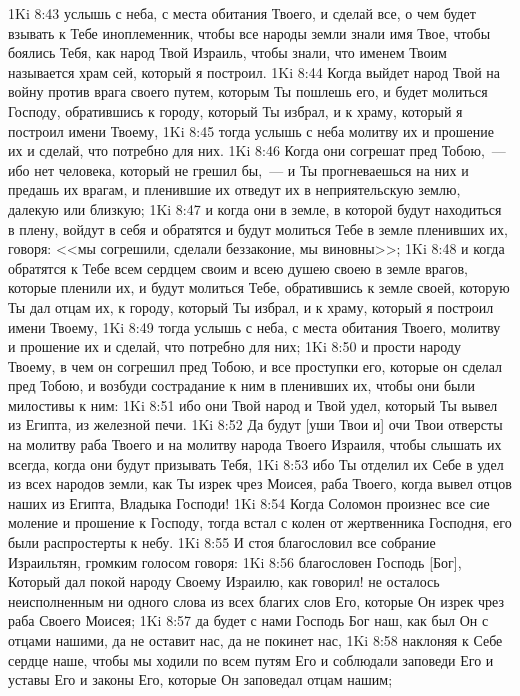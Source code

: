 \vs 1Ki 8:43 услышь с неба, с места обитания Твоего, и сделай все, о чем будет взывать к Тебе иноплеменник, чтобы все народы земли знали имя Твое, чтобы боялись Тебя, как народ Твой Израиль, чтобы знали, что именем Твоим называется храм сей, который я построил.
\vs 1Ki 8:44 Когда выйдет народ Твой на войну против врага своего путем, которым Ты пошлешь его, и будет молиться Господу, обратившись к городу, который Ты избрал, и к храму, который я построил имени Твоему,
\vs 1Ki 8:45 тогда услышь с неба молитву их и прошение их и сделай, что потребно для них.
\vs 1Ki 8:46 Когда они согрешат пред Тобою,~--- ибо нет человека, который не грешил бы,~--- и Ты прогневаешься на них и предашь их врагам, и пленившие их отведут их в неприятельскую землю, далекую или близкую;
\vs 1Ki 8:47 и когда они в земле, в которой будут находиться в плену, войдут в себя и обратятся и будут молиться Тебе в земле пленивших их, говоря: <<мы согрешили, сделали беззаконие, мы виновны>>;
\vs 1Ki 8:48 и когда обратятся к Тебе всем сердцем своим и всею душею своею в земле врагов, которые пленили их, и будут молиться Тебе, обратившись к земле своей, которую Ты дал отцам их, к городу, который Ты избрал, и к храму, который я построил имени Твоему,
\vs 1Ki 8:49 тогда услышь с неба, с места обитания Твоего, молитву и прошение их и сделай, что потребно для них;
\vs 1Ki 8:50 и прости народу Твоему, в чем он согрешил пред Тобою, и все проступки его, которые он сделал пред Тобою, и возбуди сострадание к ним в пленивших их, чтобы они были милостивы к ним:
\vs 1Ki 8:51 ибо они Твой народ и Твой удел, который Ты вывел из Египта, из железной печи.
\vs 1Ki 8:52 Да будут [уши Твои и] очи Твои отверсты на молитву раба Твоего и на молитву народа Твоего Израиля, чтобы слышать их всегда, когда они будут призывать Тебя,
\vs 1Ki 8:53 ибо Ты отделил их Себе в удел из всех народов земли, как Ты изрек чрез Моисея, раба Твоего, когда вывел отцов наших из Египта, Владыка Господи!
\rsbpar\vs 1Ki 8:54 Когда Соломон произнес все сие моление и прошение к Господу, тогда встал с колен от жертвенника Господня,  его были распростерты к небу.
\vs 1Ki 8:55 И стоя благословил все собрание Израильтян, громким голосом говоря:
\vs 1Ki 8:56 благословен Господь [Бог], Который дал покой народу Своему Израилю, как говорил! не осталось неисполненным ни одного слова из всех благих слов Его, которые Он изрек чрез раба Своего Моисея;
\vs 1Ki 8:57 да будет с нами Господь Бог наш, как был Он с отцами нашими, да не оставит нас, да не покинет нас,
\vs 1Ki 8:58 наклоняя к Себе сердце наше, чтобы мы ходили по всем путям Его и соблюдали заповеди Его и уставы Его и законы Его, которые Он заповедал отцам нашим;
